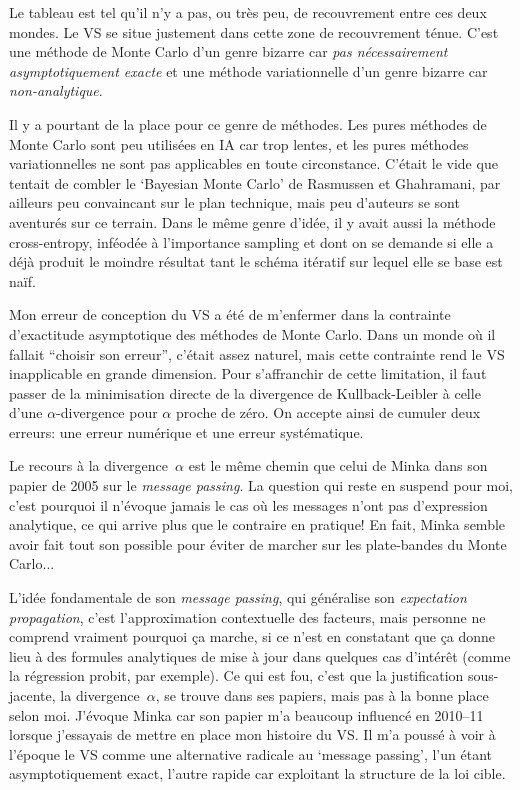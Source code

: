 \documentclass{article}
\begin{document}
Le tableau est tel qu'il n'y a pas, ou tr\`es peu, de recouvrement entre ces deux mondes. Le VS se situe justement dans cette zone de recouvrement t\'enue. C'est une m\'ethode de Monte Carlo d'un genre bizarre car {\em pas n\'ecessairement asymptotiquement exacte} et une m\'ethode variationnelle d'un genre bizarre car {\em non-analytique}. 

Il y a pourtant de la place pour ce genre de m\'ethodes. Les pures m\'ethodes de Monte Carlo sont peu utilis\'ees en IA car trop lentes, et les pures m\'ethodes variationnelles ne sont pas applicables en toute circonstance. C'\'etait le vide que tentait de combler le `Bayesian Monte Carlo' de Rasmussen et Ghahramani, par ailleurs peu convaincant sur le plan technique, mais peu d'auteurs se sont aventur\'es sur ce terrain. Dans le m\^eme genre d'id\'ee, il y avait aussi la m\'ethode cross-entropy, inf\'eod\'ee \`a l'importance sampling et dont on se demande si elle a d\'ej\`a produit le moindre r\'esultat tant le sch\'ema it\'eratif sur lequel elle se base est na\"if.

Mon erreur de conception du VS a \'et\'e de m'enfermer dans la contrainte d'exactitude asymptotique des m\'ethodes de Monte Carlo. Dans un monde o\`u il fallait ``choisir son erreur'', c'\'etait assez naturel, mais cette contrainte rend le VS inapplicable en grande dimension. Pour s'affranchir de cette limitation, il faut passer de la minimisation directe de la divergence de Kullback-Leibler \`a celle d'une $\alpha$-divergence pour $\alpha$ proche de z\'ero. On accepte ainsi de cumuler deux erreurs: une erreur num\'erique et une erreur syst\'ematique. 

Le recours \`a la divergence~$\alpha$ est le m\^eme chemin que celui de Minka dans son papier de 2005 sur le {\em message passing}. La question qui reste en suspend pour moi, c'est pourquoi il n'\'evoque jamais le cas o\`u les messages n'ont pas d'expression analytique, ce qui arrive plus que le contraire en pratique! En fait, Minka semble avoir fait tout son possible pour \'eviter de marcher sur les plate-bandes du Monte Carlo...

L'id\'ee fondamentale de son {\em message passing}, qui g\'en\'eralise son {\em expectation propagation}, c'est l'approximation contextuelle des facteurs, mais personne ne comprend vraiment pourquoi \c ca marche, si ce n'est en constatant que \c ca donne lieu \`a des formules analytiques de mise \`a jour dans quelques cas d'int\'er\^et (comme la r\'egression probit, par exemple). Ce qui est fou, c'est que la justification sous-jacente, la divergence~$\alpha$, se trouve dans ses papiers, mais pas \`a la bonne place selon moi. J'\'evoque Minka car son papier m'a beaucoup influenc\'e en 2010--11 lorsque j'essayais de mettre en place mon histoire du VS. Il m'a pouss\'e \`a voir \`a l'\'epoque le VS comme une alternative radicale au `message passing', l'un \'etant asymptotiquement exact, l'autre rapide car exploitant la structure de la loi cible. 
\end{document}
